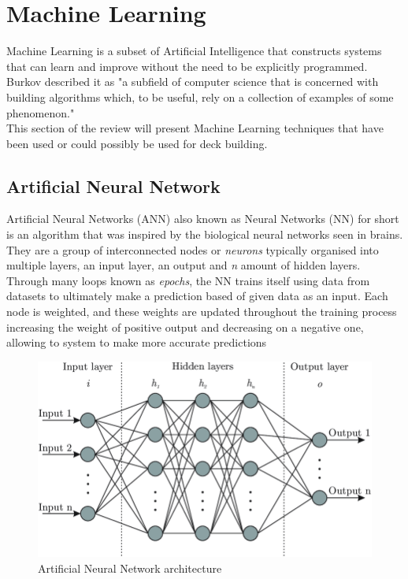 \documentclass{report}
\begin{document}
\section{Machine Learning}
Machine Learning is a subset of Artificial Intelligence that constructs systems that can learn and improve without the need to be explicitly programmed. Burkov described it as "a subﬁeld of computer science that is concerned with building algorithms which, to be useful, rely on a collection of examples of some phenomenon." \cite{burkov2019} \\
\indent This section of the review will present Machine Learning techniques that have been used or could possibly be used for deck building.
\subsection{Artificial Neural Network}
Artificial Neural Networks (ANN) also known as Neural Networks (NN) for short is an algorithm that was inspired by the biological neural networks seen in brains. They are a group of interconnected nodes or \textit{neurons} typically organised into multiple layers, an input layer, an output and \textit{n} amount of hidden layers. Through many loops known as \textit{epochs}, the NN trains itself using data from datasets to ultimately make a prediction based of given data as an input. Each node is weighted, and these weights are updated throughout the training process increasing the weight of positive output and decreasing on a negative one, allowing to system to make more accurate predictions \cite{3blue1brown}  \\
\begin{figure}[h]
\centering
\includegraphics[width=1\textwidth]{ANN}
\caption{Artificial Neural Network architecture \cite{Facundo2017}  }
\label{ea}
\end{figure}
\end{document}
